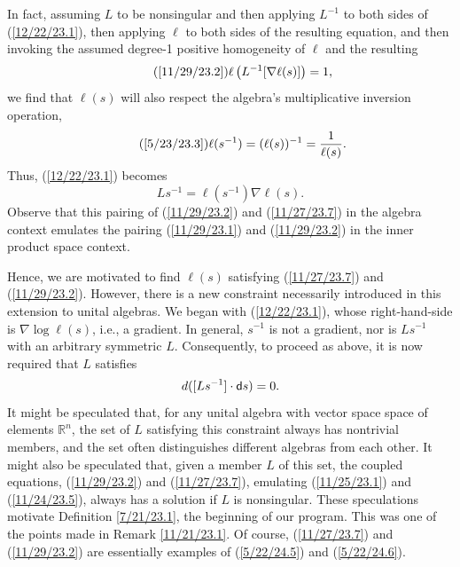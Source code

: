 \documentclass{amsart}
\numberwithin{equation}{section}
\theoremstyle{definition}
\numberwithin{theorem}{section}
\begin{document}
In fact, assuming $L$ to be nonsingular and then applying $L^{-1}$ to both sides of (\ref{12/22/23.1}), then applying $\ell$ to both sides of the resulting equation, and then invoking the assumed degree-1 positive homogeneity of $\ell$ and the resulting \begin{equation}\tag{\ref{11/29/23.2}}\ell\left(L^{-1}[\nabla\ell(s)]\right) = 1,\end{equation} we find that $\ell(s)$ will also respect the algebra's multiplicative inversion operation, \begin{equation}\tag{\ref{5/23/23.3}} \ell(s^{-1}) = (\ell(s))^{-1} = \frac{1}{\ell(s)}.\end{equation}    Thus, (\ref{12/22/23.1}) becomes \begin{equation}\label{11/27/23.7} Ls^{-1} = \ell(s^{-1})\nabla\ell(s).\end{equation}    Observe that this pairing of (\ref{11/29/23.2}) and (\ref{11/27/23.7}) in the algebra context emulates the pairing (\ref{11/29/23.1}) and (\ref{11/29/23.2}) in the inner product space context.
  
  Hence, we are motivated to find $\ell(s)$ satisfying (\ref{11/27/23.7}) and (\ref{11/29/23.2}). 
  However, there is a new constraint necessarily introduced in this extension to unital algebras.  We began with (\ref{12/22/23.1}), whose right-hand-side is $\nabla\log\ell(s)$, i.e., a gradient.  In general, $s^{-1}$ is not a gradient, nor is $Ls^{-1}$ with an arbitrary symmetric $L$. Consequently, to proceed as above, it is now required that $L$ satisfies \[ d([Ls^{-1}]\cdot {\sf d}s) = 0.\]  It might be speculated that, for any unital algebra with vector space space of elements $\mathbb{R}^n$, the set of $L$ satisfying this constraint always has nontrivial members, and the set often distinguishes different algebras from each other.  It might also be speculated that, given a member $L$ of this set,  the coupled equations, (\ref{11/29/23.2}) and (\ref{11/27/23.7}), emulating (\ref{11/25/23.1}) and (\ref{11/24/23.5}), always has a solution if $L$ is nonsingular.
  These speculations motivate Definition \ref{7/21/23.1}, the beginning of our program.  This was one of the points made in  Remark \ref{11/21/23.1}.  Of course, (\ref{11/27/23.7}) and (\ref{11/29/23.2}) are essentially examples of (\ref{5/22/24.5}) and (\ref{5/22/24.6}). 
\end{document}
